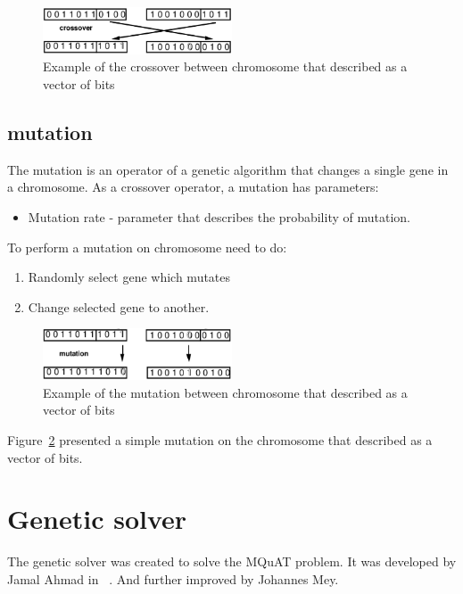 \begin{figure}
	\centering
	\includegraphics[width=0.5\textwidth]{images/crossoverVector.png}
	\caption[Example of the crossover]{Example of the crossover between chromosome that described as a vector of bits}
	\label{fig:crossoverVector}
\end{figure}

\subsection{mutation}\label{sec:GeneticAlgorithmMutation}

The mutation is an operator of a genetic algorithm that changes a single gene in a chromosome. As a crossover operator, a mutation has parameters:

\begin{itemize}
	\item Mutation rate - parameter that describes the probability of mutation.
\end{itemize}

To perform a mutation on chromosome need to do:

\begin{enumerate}
	\item Randomly select gene which mutates
	\item Change selected gene to another.
\end{enumerate}

\begin{figure}
	\centering
	\includegraphics[width=0.5\textwidth]{images/MutationVector.png}
	\caption[Example of the mutation]{Example of the mutation between chromosome that described as a vector of bits}
	\label{fig:MutationVector}
\end{figure}

Figure~\ref{fig:MutationVector} presented a simple mutation on the chromosome that described as a vector of bits.




\section{Genetic solver}\label{sec:GeneticSolver}
The genetic solver was created to solve the MQuAT problem. It was developed by Jamal Ahmad in ~\cite{ahmad18}. And further improved by Johannes Mey.

